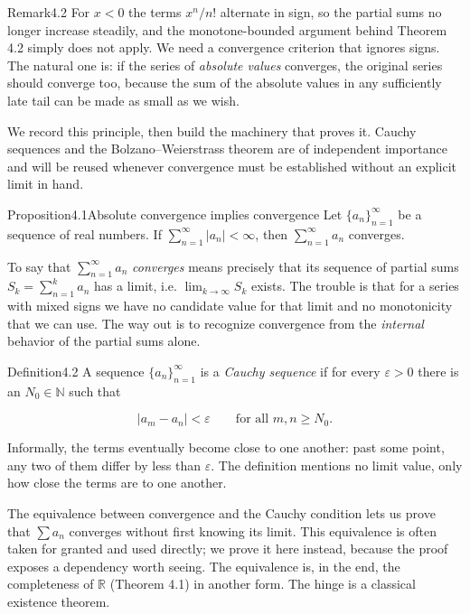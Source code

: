 \documentclass[a4paper,12pt,oneside]{memoir}
\begin{document}
\begin{envremark}{Remark}{4.2}{}
For \(x < 0\) the terms \(x^{n}/n!\) alternate in sign, so the partial sums no longer increase steadily, and the monotone-bounded argument behind Theorem 4.2 simply does not apply. We need a convergence criterion that ignores signs. The natural one is: if the series of \emph{absolute values} converges, the original series should converge too, because the sum of the absolute values in any sufficiently late tail can be made as small as we wish.
\end{envremark}
We record this principle, then build the machinery that proves it. Cauchy sequences and the Bolzano–Weierstrass theorem are of independent importance and will be reused whenever convergence must be established without an explicit limit in hand.

\begin{envproposition}{Proposition}{4.1}{Absolute convergence implies convergence}
Let \(\{a_{n}\}_{n=1}^{\infty}\) be a sequence of real numbers. If \(\displaystyle\sum_{n=1}^{\infty} \lvert a_{n} \rvert < \infty\), then \(\displaystyle\sum_{n=1}^{\infty} a_{n}\) converges.
\end{envproposition}
To say that \(\sum_{n=1}^{\infty} a_{n}\) \emph{converges} means precisely that its sequence of partial sums \(S_{k} = \sum_{n=1}^{k} a_{n}\) has a limit, i.e. \(\lim_{k \to \infty} S_{k}\) exists. The trouble is that for a series with mixed signs we have no candidate value for that limit and no monotonicity that we can use. The way out is to recognize convergence from the \emph{internal} behavior of the partial sums alone.

\begin{envdefinition}{Definition}{4.2}{}
A sequence \(\{a_{n}\}_{n=1}^{\infty}\) is a \emph{Cauchy sequence} if for every \(\varepsilon > 0\) there is an \(N_{0} \in \mathbb{N}\) such that

\[ \lvert a_{m} - a_{n} \rvert < \varepsilon \qquad \text{for all } m, n \ge N_{0}. \]

\begin{informal}
Informally, the terms eventually become close to one another: past some point, any two of them differ by less than \(\varepsilon\). The definition mentions no limit value, only how close the terms are to one another.
\end{informal}
\end{envdefinition}
The equivalence between convergence and the Cauchy condition lets us prove that \(\sum a_{n}\) converges without first knowing its limit. This equivalence is often taken for granted and used directly; we prove it here instead, because the proof exposes a dependency worth seeing. The equivalence is, in the end, the completeness of \(\mathbb{R}\) (Theorem 4.1) in another form. The hinge is a classical existence theorem.
\end{document}

